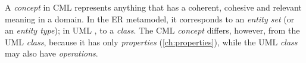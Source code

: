 A \emph{concept} in CML represents anything
that has a coherent, cohesive and relevant meaning in a domain.
In the ER \cite{er} metamodel,
it corresponds to an \emph{entity set} (or an \emph{entity type});
in UML \cite{uml},
to a \emph{class}.
The CML \emph{concept} differs, however, from the UML \emph{class},
because it has only \emph{properties} (\ref{ch:properties}),
while the UML \emph{class} may also have \emph{operations}.